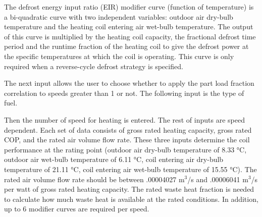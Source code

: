 The defrost energy input ratio (EIR) modifier curve (function of temperature) is a bi-quadratic curve with two independent variables: outdoor air dry-bulb temperature and the heating coil entering air wet-bulb temperature. The output of this curve is multiplied by the heating coil capacity, the fractional defrost time period and the runtime fraction of the heating coil to give the defrost power at the specific temperatures at which the coil is operating. This curve is only required when a reverse-cycle defrost strategy is specified.

The next input allows the user to choose whether to apply the part load fraction correlation to speeds greater than 1 or not. The following input is the type of fuel.

Then the number of speed for heating is entered. The rest of inputs are speed dependent. Each set of data consists of gross rated heating capacity, gross rated COP, and the rated air volume flow rate. These three inputs determine the coil performance at the rating point (outdoor air dry-bulb temperature of 8.33 °C, outdoor air wet-bulb temperature of 6.11 °C, coil entering air dry-bulb temperature of 21.11 °C, coil entering air wet-bulb temperature of 15.55 °C). The rated air volume flow rate should be between .00004027 m\(^{3}\)/s and .00006041 m\(^{3}\)/s per watt of gross rated heating capacity. The rated waste heat fraction is needed to calculate how much waste heat is available at the rated conditions. In addition, up to 6 modifier curves are required per speed.

